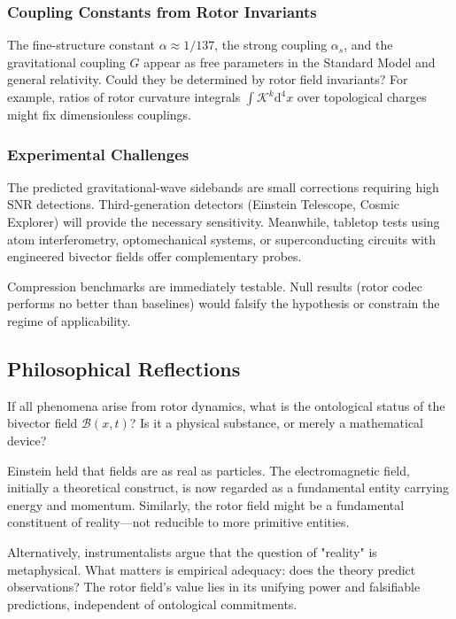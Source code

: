 \documentclass[11pt,a4paper]{article}
\newcommand{\Biv}{\mathcal{B}}
\theoremstyle{definition}
\theoremstyle{plain}
\theoremstyle{remark}
\begin{document}
\subsubsection{Coupling Constants from Rotor Invariants}

The fine-structure constant $\alpha \approx 1/137$, the strong coupling $\alpha_s$, and the gravitational coupling $G$ appear as free parameters in the Standard Model and general relativity. Could they be determined by rotor field invariants? For example, ratios of rotor curvature integrals $\int \mathcal{K}^k \mathrm{d}^4x$ over topological charges might fix dimensionless couplings.

\subsubsection{Experimental Challenges}

The predicted gravitational-wave sidebands are small corrections requiring high SNR detections. Third-generation detectors (Einstein Telescope, Cosmic Explorer) will provide the necessary sensitivity. Meanwhile, tabletop tests using atom interferometry, optomechanical systems, or superconducting circuits with engineered bivector fields offer complementary probes.

Compression benchmarks are immediately testable. Null results (rotor codec performs no better than baselines) would falsify the hypothesis or constrain the regime of applicability.

\subsection{Philosophical Reflections}

If all phenomena arise from rotor dynamics, what is the ontological status of the bivector field $\Biv(x,t)$? Is it a physical substance, or merely a mathematical device?

Einstein held that fields are as real as particles. The electromagnetic field, initially a theoretical construct, is now regarded as a fundamental entity carrying energy and momentum. Similarly, the rotor field might be a fundamental constituent of reality---not reducible to more primitive entities.

Alternatively, instrumentalists argue that the question of "reality" is metaphysical. What matters is empirical adequacy: does the theory predict observations? The rotor field's value lies in its unifying power and falsifiable predictions, independent of ontological commitments.
\end{document}
